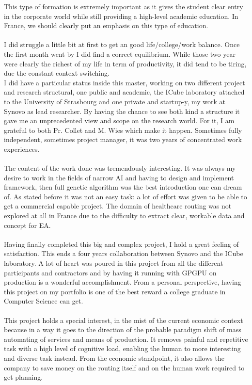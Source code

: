 \documentclass[12pt]{memoir}
\begin{document}
This type of formation is extremely important as it gives the student clear entry in the corporate world while
still providing a high-level academic education. In France, we should clearly put an emphasis on this type of education.\\
\\
I did struggle a little bit at first to get an good life/college/work balance. Once the first month went by I did find
a correct equilibrium. While those two year were clearly the richest of my life in term of productivity, it did tend to
be tiring, due the constant context switching.\\
I did have a particular status inside this master, working on two different project and research structural,
one public and academic, the ICube laboratory attached to the University of Strasbourg and one private and
startup-y, my work at Synovo as lead researcher. By having the chance to see both kind a structure it gave me an
unprecedented view and scope on the research world. For it, I am grateful to both Pr. Collet and M. Wies which make it happen.
Sometimes fully independent, sometimes project manager, it was two years of concentrated work experiences.\\
\\
The content of the work done was tremendously interesting. It was always my desire to work in the fields of narrow AI and
having to design and implement framework, then full genetic algorithm was the best introduction one can dream of. As stated before
it was not an easy task: a lot of effort was given to be able to get a commercial capable project. The domain of healthcare routing
was not explored at all in France due to the difficulty to extract clear, workable data and concept for EA.\\
\\
Having finally completed this big and complex project, I hold a great feeling of satisfaction.
This ends a four years collaboration between Synovo and the ICube laboratory. A lot of heart was poured in this project from
all the different participants and contractors and by having it running with GPGPU on production is a wonderful accomplishment.
From a personal perspective, having this project on my portfolio is one of the best reward a college graduate in Computer Science can get.\\
\\
This project holds a special interest, in the mist of the current economic context because in a way it goes to the direction
of the probable paradigm shift of mass automating of services and means of production. It removes painful and repetitive task
with a high level of cognitive load, enabling the human to more interesting and diverse task instead.
From the economic standpoint, it also allows the company to save money on the routing itself and on the human work required to get planning. \\
\\



\end{document}
